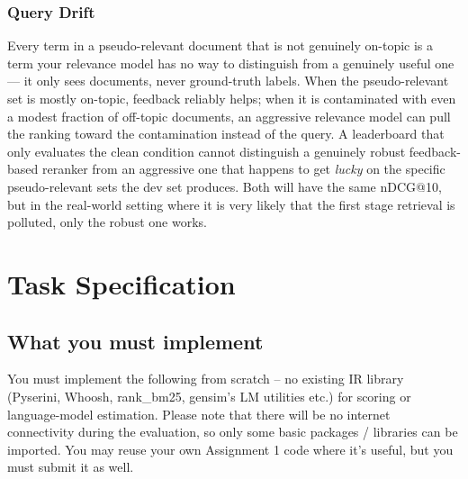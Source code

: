 \documentclass[10pt]{article}
\begin{document}
\subsubsection{Query Drift}
Every term in a pseudo-relevant document that is not genuinely on-topic is a term your relevance model has no way to distinguish from a genuinely useful one — it only sees documents, never ground-truth labels. When the pseudo-relevant set is mostly on-topic, feedback reliably helps; when it is contaminated with even a modest fraction of off-topic documents, an aggressive relevance model can pull the ranking toward the contamination instead of the query. A leaderboard that only evaluates the clean condition cannot distinguish a genuinely robust feedback-based reranker from an aggressive one that happens to get \emph{lucky} on the specific pseudo-relevant sets the dev set produces. Both will have the same nDCG@10, but in the real-world setting where it is very likely that the first stage retrieval is polluted, only the robust one works. 


\section{Task Specification}
\subsection{What you must implement} 
You must implement the following from scratch -- no existing IR library (Pyserini, Whoosh, rank\_bm25, gensim's LM utilities etc.) for scoring or language-model estimation. Please note that there will be no internet connectivity during the evaluation, so only some basic packages / libraries can be imported. You may reuse your own Assignment 1 code where it's useful, but you must submit it as well. 
\end{document}
